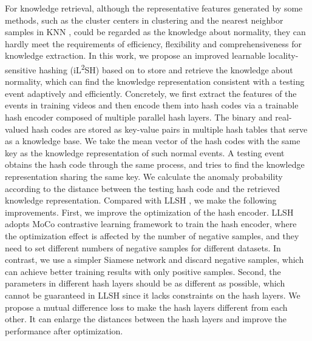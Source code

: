 \documentclass[lettersize,journal]{IEEEtran}
\begin{document}
For knowledge retrieval, although the representative features generated by some methods, such as the cluster centers in clustering \cite{ClusterAttention2020wanga} and the nearest neighbor samples in KNN \cite{StreetScene2020ramachandraa}, could be regarded as the knowledge about normality, they can hardly meet the requirements of efficiency, flexibility and comprehensiveness for knowledge extraction.
In this work, we propose an improved learnable locality-sensitive hashing (iL\textsuperscript{2}SH) based on \cite{LearnableLocalitySensitive2021lu} to store and retrieve the knowledge about normality, which can find the knowledge representation consistent with a testing event adaptively and efficiently.
Concretely, we first extract the features of the events in training videos and then encode them into hash codes via a trainable hash encoder composed of multiple parallel hash layers.
The binary and real-valued hash codes are stored as key-value pairs in multiple hash tables that serve as a knowledge base. 
We take the mean vector of the hash codes with the same key as the knowledge representation of such normal events.
A testing event obtains the hash code through the same process, and tries to find the knowledge representation sharing the same key.
We calculate the anomaly probability according to the distance between the testing hash code and the retrieved knowledge representation.
Compared with LLSH \cite{LearnableLocalitySensitive2021lu}, we make the following improvements.
First, we improve the optimization of the hash encoder.
LLSH adopts MoCo \cite{MomentumContrast2020he} contrastive learning framework to train the hash encoder, where the optimization effect is affected by the number of negative samples, and they need to set different numbers of negative samples for different datasets.
In contrast, we use a simpler Siamese network and discard negative samples, which can achieve better training results with only positive samples.
Second, the parameters in different hash layers should be as different as possible, which cannot be guaranteed in LLSH since it lacks constraints on the hash layers.
We propose a mutual difference loss to make the hash layers different from each other.
It can enlarge the distances between the hash layers and improve the performance after optimization.
\end{document}
